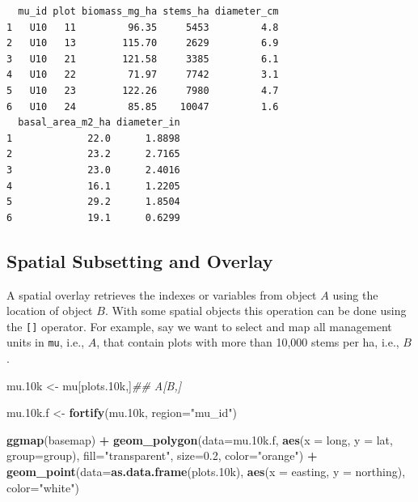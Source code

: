 \documentclass[
]{krantz}
\makeatletter
\newenvironment{Shaded}{\begin{snugshade}}{\end{snugshade}}
\newcommand{\CommentTok}[1]{\textcolor[rgb]{0.37,0.37,0.37}{\textit{#1}}}
\newcommand{\DataTypeTok}[1]{\textcolor[rgb]{0.27,0.27,0.27}{#1}}
\newcommand{\FloatTok}[1]{\textcolor[rgb]{0.06,0.06,0.06}{#1}}
\newcommand{\KeywordTok}[1]{\textcolor[rgb]{0.27,0.27,0.27}{\textbf{#1}}}
\newcommand{\NormalTok}[1]{#1}
\newcommand{\OperatorTok}[1]{\textcolor[rgb]{0.43,0.43,0.43}{\textbf{#1}}}
\newcommand{\StringTok}[1]{\textcolor[rgb]{0.5,0.5,0.5}{#1}}
\newenvironment{kframe}{%
\medskip{}
\setlength{\fboxsep}{.8em}
 \def\at@end@of@kframe{}%
 \ifinner\ifhmode%
  \def\at@end@of@kframe{\end{minipage}}%
  \begin{minipage}{\columnwidth}%
 \fi\fi%
 \def\FrameCommand##1{\hskip\@totalleftmargin \hskip-\fboxsep
 \colorbox{shadecolor}{##1}\hskip-\fboxsep
     \hskip-\linewidth \hskip-\@totalleftmargin \hskip\columnwidth}%
 \MakeFramed {\advance\hsize-\width
   \@totalleftmargin\z@ \linewidth\hsize
   \@setminipage}}%
 {\par\unskip\endMakeFramed%
 \at@end@of@kframe}
\renewenvironment{Shaded}{\begin{kframe}}{\end{kframe}}
\makeatother
\begin{document}
\begin{verbatim}
  mu_id plot biomass_mg_ha stems_ha diameter_cm
1   U10   11         96.35     5453         4.8
2   U10   13        115.70     2629         6.9
3   U10   21        121.58     3385         6.1
4   U10   22         71.97     7742         3.1
5   U10   23        122.26     7980         4.7
6   U10   24         85.85    10047         1.6
  basal_area_m2_ha diameter_in
1             22.0      1.8898
2             23.2      2.7165
3             23.0      2.4016
4             16.1      1.2205
5             29.2      1.8504
6             19.1      0.6299
\end{verbatim}

\hypertarget{spatial-subsetting-and-overlay}{%
\subsection{Spatial Subsetting and Overlay}\label{spatial-subsetting-and-overlay}}

A spatial overlay retrieves the indexes or variables from object \(A\) using the location of object \(B\). With some spatial objects this operation can be done using the \texttt{{[}{]}} operator. For example, say we want to select and map all management units in \texttt{mu}, i.e., \(A\), that contain plots with more than 10,000 stems per ha, i.e., \(B\).

\begin{Shaded}
\begin{Highlighting}[]
\NormalTok{mu}\FloatTok{.10}\NormalTok{k \textless{}{-}}\StringTok{ }\NormalTok{mu[plots}\FloatTok{.10}\NormalTok{k,]}\CommentTok{\#\# A[B,]}

\NormalTok{mu}\FloatTok{.10}\NormalTok{k.f \textless{}{-}}\StringTok{ }\KeywordTok{fortify}\NormalTok{(mu}\FloatTok{.10}\NormalTok{k, }\DataTypeTok{region=}\StringTok{"mu\_id"}\NormalTok{)}

\KeywordTok{ggmap}\NormalTok{(basemap) }\OperatorTok{+}
\StringTok{    }\KeywordTok{geom\_polygon}\NormalTok{(}\DataTypeTok{data=}\NormalTok{mu}\FloatTok{.10}\NormalTok{k.f, }\KeywordTok{aes}\NormalTok{(}\DataTypeTok{x =}\NormalTok{ long, }\DataTypeTok{y =}\NormalTok{ lat, }\DataTypeTok{group=}\NormalTok{group), }\DataTypeTok{fill=}\StringTok{"transparent"}\NormalTok{, }\DataTypeTok{size=}\FloatTok{0.2}\NormalTok{, }\DataTypeTok{color=}\StringTok{"orange"}\NormalTok{) }\OperatorTok{+}
\StringTok{    }\KeywordTok{geom\_point}\NormalTok{(}\DataTypeTok{data=}\KeywordTok{as.data.frame}\NormalTok{(plots}\FloatTok{.10}\NormalTok{k), }\KeywordTok{aes}\NormalTok{(}\DataTypeTok{x =}\NormalTok{ easting, }\DataTypeTok{y =}\NormalTok{ northing), }\DataTypeTok{color=}\StringTok{"white"}\NormalTok{)}
\end{Highlighting}
\end{Shaded}
\end{document}
